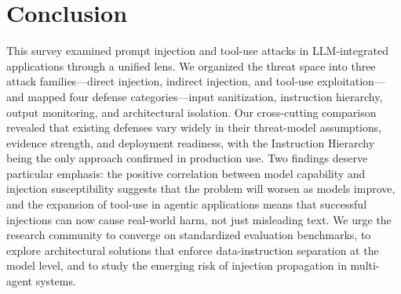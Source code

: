 \section{Conclusion}
\label{sec:conclusion}

This survey examined prompt injection and tool-use attacks in LLM-integrated applications through a unified lens. We organized the threat space into three attack families---direct injection, indirect injection, and tool-use exploitation---and mapped four defense categories---input sanitization, instruction hierarchy, output monitoring, and architectural isolation. Our cross-cutting comparison revealed that existing defenses vary widely in their threat-model assumptions, evidence strength, and deployment readiness, with the Instruction Hierarchy being the only approach confirmed in production use. Two findings deserve particular emphasis: the positive correlation between model capability and injection susceptibility suggests that the problem will worsen as models improve, and the expansion of tool-use in agentic applications means that successful injections can now cause real-world harm, not just misleading text. We urge the research community to converge on standardized evaluation benchmarks, to explore architectural solutions that enforce data-instruction separation at the model level, and to study the emerging risk of injection propagation in multi-agent systems.
